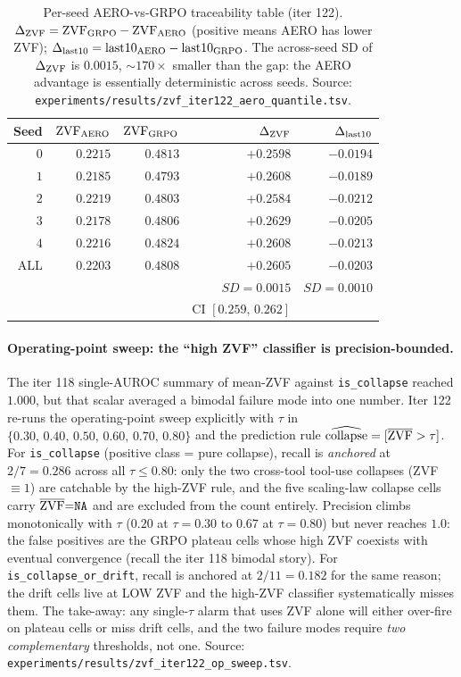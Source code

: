 \begin{table}[htbp]
\centering\small
\setlength{\tabcolsep}{4pt}
\begin{tabular}{rrrrr}
\hline
Seed & $\mathrm{ZVF}_{\text{AERO}}$ & $\mathrm{ZVF}_{\text{GRPO}}$ & $\Delta_{\rm ZVF}$ & $\Delta_{\rm last10}$ \\
\hline
$0$ & $0.2215$ & $0.4813$ & $+0.2598$ & $-0.0194$ \\
$1$ & $0.2185$ & $0.4793$ & $+0.2608$ & $-0.0189$ \\
$2$ & $0.2219$ & $0.4803$ & $+0.2584$ & $-0.0212$ \\
$3$ & $0.2178$ & $0.4806$ & $+0.2629$ & $-0.0205$ \\
$4$ & $0.2216$ & $0.4824$ & $+0.2608$ & $-0.0213$ \\
\hline
ALL & $0.2203$ & $0.4808$ & $+0.2605$ & $-0.0203$ \\
& & & $SD\!=\!0.0015$ & $SD\!=\!0.0010$ \\
& & & CI $[0.259,\,0.262]$ & \\
\hline
\end{tabular}
\caption{Per-seed AERO-vs-GRPO traceability table (iter 122).
$\Delta_{\rm ZVF} = \mathrm{ZVF}_{\text{GRPO}} - \mathrm{ZVF}_{\text{AERO}}$ (positive means AERO has
lower ZVF); $\Delta_{\rm last10} = \text{last10}_{\rm AERO} -
\text{last10}_{\rm GRPO}$. The across-seed SD of $\Delta_{\rm ZVF}$
is $0.0015$, $\sim 170\times$ smaller than the gap: the AERO
advantage is essentially deterministic across seeds. Source:
\texttt{experiments/results/zvf\_iter122\_aero\_quantile.tsv}.}
\label{tab:zvf-iter122-aero}
\end{table}

\paragraph{Operating-point sweep: the ``high ZVF'' classifier is precision-bounded.}
The iter 118 single-AUROC summary of mean-ZVF against
\texttt{is\_collapse} reached $1.000$, but that scalar averaged a
bimodal failure mode into one number. Iter 122 re-runs the
operating-point sweep explicitly with $\tau$ in
$\{0.30,\,0.40,\,0.50,\,0.60,\,0.70,\,0.80\}$ and the prediction
rule $\widehat{\text{collapse}} = [\overline{\mathrm{ZVF}} > \tau]$. For
\texttt{is\_collapse} (positive class = pure collapse),
recall is \emph{anchored} at $2/7 = 0.286$ across all $\tau \le
0.80$: only the two cross-tool tool-use collapses (ZVF $\equiv 1$)
are catchable by the high-ZVF rule, and the five scaling-law
collapse cells carry $\overline{\mathrm{ZVF}}{=}\texttt{NA}$ and are excluded
from the count entirely. Precision climbs monotonically with
$\tau$ ($0.20$ at $\tau{=}0.30$ to $0.67$ at $\tau{=}0.80$) but
never reaches $1.0$: the false positives are the GRPO plateau
cells whose high ZVF coexists with eventual convergence (recall
the iter 118 bimodal story). For
\texttt{is\_collapse\_or\_drift}, recall is anchored at $2/11 =
0.182$ for the same reason; the drift cells live at LOW ZVF and
the high-ZVF classifier systematically misses them. The
take-away: any single-$\tau$ alarm that uses ZVF alone will
either over-fire on plateau cells or miss drift cells, and the
two failure modes require \emph{two complementary} thresholds,
not one. Source:
\texttt{experiments/results/zvf\_iter122\_op\_sweep.tsv}.

